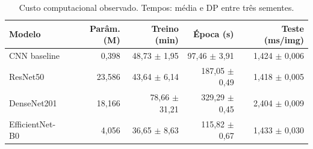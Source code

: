 \begin{table}[htbp]
\centering
\caption{Custo computacional observado. Tempos: média e DP entre três sementes.}
\label{tab:cost}
\small
\begin{tabular}{lrrrr}
\toprule
Modelo & Parâm. (M) & Treino (min) & Época (s) & Teste (ms/img) \\
\midrule
CNN baseline & 0,398 & 48,73 $\pm$ 1,95 & 97,46 $\pm$ 3,91 & 1,424 $\pm$ 0,006 \\
ResNet50 & 23,586 & 43,64 $\pm$ 6,14 & 187,05 $\pm$ 0,49 & 1,418 $\pm$ 0,005 \\
DenseNet201 & 18,166 & 78,66 $\pm$ 31,21 & 329,29 $\pm$ 0,45 & 2,404 $\pm$ 0,009 \\
EfficientNet-B0 & 4,056 & 36,65 $\pm$ 8,63 & 115,82 $\pm$ 0,67 & 1,433 $\pm$ 0,030 \\
\bottomrule
\end{tabular}
\end{table}
